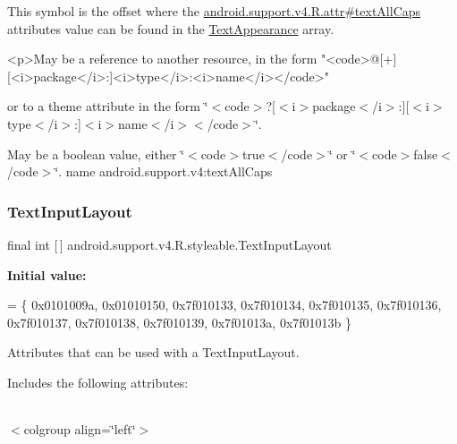 This symbol is the offset where the \hyperlink{classandroid_1_1support_1_1v4_1_1R_1_1attr_af49e1396fa93fb3c916d95b6b825adf7}{android.\+support.\+v4.\+R.\+attr\#text\+All\+Caps} attribute\textquotesingle{}s value can be found in the \hyperlink{classandroid_1_1support_1_1v4_1_1R_1_1styleable_a81c402d7a6e327c354a1cf72b21fc4f5}{Text\+Appearance} array.

\begin{DoxyVerb}      <p>May be a reference to another resource, in the form "<code>@[+][<i>package</i>:]<i>type</i>:<i>name</i></code>"
\end{DoxyVerb}
 or to a theme attribute in the form \char`\"{}$<$code$>$?\mbox{[}$<$i$>$package$<$/i$>$\+:\mbox{]}\mbox{[}$<$i$>$type$<$/i$>$\+:\mbox{]}$<$i$>$name$<$/i$>$$<$/code$>$\char`\"{}. 

May be a boolean value, either \char`\"{}$<$code$>$true$<$/code$>$\char`\"{} or \char`\"{}$<$code$>$false$<$/code$>$\char`\"{}.  name android.\+support.\+v4\+:text\+All\+Caps \mbox{\label{classandroid_1_1support_1_1v4_1_1R_1_1styleable_a86943debf88d7a9dc4c0627a8546913d}} 
\subsubsection{\texorpdfstring{Text\+Input\+Layout}{TextInputLayout}}
{\footnotesize\ttfamily final int \mbox{[}$\,$\mbox{]} android.\+support.\+v4.\+R.\+styleable.\+Text\+Input\+Layout\hspace{0.3cm}{\ttfamily [static]}}

{\bfseries Initial value\+:}
\begin{DoxyCode}
= \{
            0x0101009a, 0x01010150, 0x7f010133, 0x7f010134,
            0x7f010135, 0x7f010136, 0x7f010137, 0x7f010138,
            0x7f010139, 0x7f01013a, 0x7f01013b
        \}
\end{DoxyCode}
Attributes that can be used with a Text\+Input\+Layout. 

Includes the following attributes\+:

\tabulinesep=1mm
\begin{longtabu} spread 0pt [c]{*{0}{|X[-1]}|}
\hline
\end{longtabu}
$<$colgroup align=\char`\"{}left\char`\"{}$>$ 

